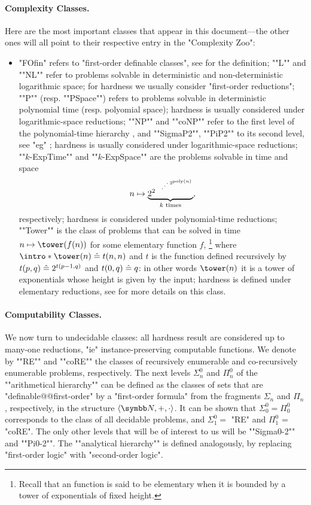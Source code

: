 \paragraph*{Complexity Classes.}
Here are the most important classes that appear in this document---the other ones
will all point to their respective entry in the "Complexity Zoo":
\begin{itemize}
	\item "FOfin" refers to "first-order definable classes", see  for the definition;
	\itemAP ""L"" and ""NL"" refer to problems solvable in deterministic and non-deterministic logarithmic 
	space; for hardness we usually consider "first-order reductions";
	\itemAP ""P"" (resp. ""PSpace"") refers to problems solvable in deterministic polynomial time
	(resp. polyomial space); hardness is usually considered under logarithmic-space reductions;
	\itemAP ""NP"" and ""coNP"" refer to the first level of the polynomial-time hierarchy
		\cite[\S~2]{AroraBarak2009ComputationalComplexity},
		and ""SigmaP2"", ""PiP2"" to its second level,
		see "eg" \cite[\S~5]{AroraBarak2009ComputationalComplexity};
		hardness is usually considered under logarithmic-space reductions;
	\itemAP ""$k$-ExpTime"" and ""$k$-ExpSpace"" are the
		problems solvable in time and space
		\[n \mapsto \underbrace{2^{2^{{\,\rotatebox{90}{\tiny$\ddots$}\,}^{2^{\poly(n)}}}}}_{k \text{ times}},\]
		respectively; hardness is considered under polynomial-time reductions;
	\itemAP ""Tower"" is the class of problems that can be solved in time
		$n\mapsto \tower(f(n))$ for some elementary function $f$,%
		\footnote{Recall that an function is said to be elementary when it
		is bounded by a tower of exponentials of fixed height.}
		where $\intro*\tower(n) \defeq t(n,n)$ and $t$ is the function
		defined recursively by $t(p,q) \mathrel{\hat{=}} 2^{t(p-1,q)}$ and $t(0,q) \mathrel{\hat{=}} q$:
		in other words $\tower(n)$ it is a tower of exponentials whose height is given by the input;
		hardness is defined under elementary reductions,
		see \cite{Schmitz2016ComplexityHierarchies} for more details on this class.
\end{itemize}

\paragraph*{Computability Classes.}
We now turn to undecidable classes: all hardness result are considered up to
many-one reductions, "ie" instance-preserving computable functions.
We denote by \AP""RE"" and ""coRE"" the classes of recursively enumerable
and co-recursively enumerable problems, respectively. 
The next levels $\Sigma^0_n$ and $\Pi^0_n$ of the \AP""arithmetical hierarchy"" can be defined 
as the classes of sets that are "definable@@first-order" by a "first-order formula"
from the fragments $\Sigma_n$ and $\Pi_n$, respectively, in the structure $\tup{\N,+,\cdot}$.
It can be shown that $\Sigma^0_0 = \Pi^0_0$ corresponds to the class of all decidable problems,
and $\Sigma^0_1 =$ "RE" and $\Pi^0_1$ = "coRE". The only other levels that will be of interest
to us will be \AP""Sigma0-2"" and ""Pi0-2"".
The ""analytical hierarchy"" is defined analogously, by replacing "first-order logic" with
"second-order logic".


